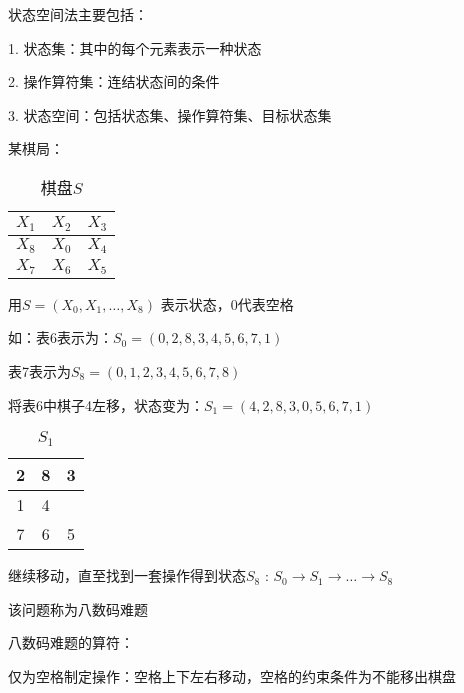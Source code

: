 \begin{notation}
    状态空间法主要包括：

    1. 状态集：其中的每个元素表示一种状态

    2. 操作算符集：连结状态间的条件

    3. 状态空间：包括状态集、操作算符集、目标状态集
\end{notation}
\begin{eg}
    某棋局：
    \begin{table}[htpb]
        \centering
        \caption{棋盘$S$}
        \label{tab:棋盘S}
        \begin{tabular}{|c|c|c|}
        \hline
        $X_1$ & $X_2$ & $X_3$ \\
        \hline
        $X_8$ & $X_0$ & $X_4$ \\
        \hline
        $X_7$ & $X_6$ & $X_5$ \\
        \hline
        \end{tabular}
    \end{table}

    用$S=\left( X_0,X_1,\ldots,X_8 \right) $ 表示状态，0代表空格

    如：表6表示为：$S_0=\left( 0,2,8,3,4,5,6,7,1 \right) $

    表7表示为$S_8=\left( 0,1,2,3,4,5,6,7,8 \right) $

    将表6中棋子4左移，状态变为：$S_1=\left( 4,2,8,3,0,5,6,7,1 \right) $
    \begin{table}[htpb]
        \centering
        \caption{$S_1$}
        \label{tab:S1}
        \begin{tabular}{|c|c|c|}
        \hline
        2 & 8 & 3 \\
        \hline
        1 & 4 &   \\
        \hline
        7 & 6 & 5 \\
        \hline
        \end{tabular}
    \end{table}

    继续移动，直至找到一套操作得到状态$S_8$ : $S_0\to S_1\to \ldots\to S_8$

    该问题称为八数码难题
\end{eg}
\begin{notation}
    八数码难题的算符：

    仅为空格制定操作：空格上下左右移动，空格的约束条件为不能移出棋盘
\end{notation}
